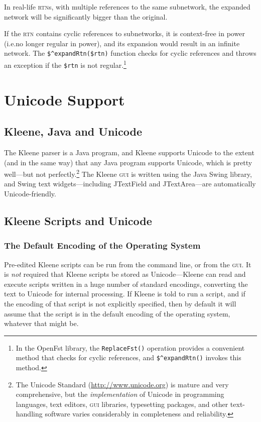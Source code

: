 \documentclass[letterpaper,12pt]{article}
\newcommand{\acro}{\textsc}
\begin{document}
\noindent
In real-life \acro{rtn}s, with multiple references to the same
subnetwork, the expanded network will be significantly bigger than the
original.  

If the \acro{rtn} contains cyclic references to subnetworks, it is
context-free in power (i.e.\@ no longer regular in power), and its
expansion would result in an infinite network.  The
\verb!$^expandRtn($rtn)! function checks for cyclic references and throws
an exception if the \verb!$rtn! is not regular.\footnote{In the OpenFst
library, the \verb!ReplaceFst()! operation provides a convenient method
that checks for cyclic references, and \verb!$^expandRtn()! invokes this
method.}


\section{Unicode Support}

\subsection{Kleene, Java and Unicode}

The Kleene parser is a Java program, and Kleene supports Unicode to the extent (and
in the same way) that any Java program supports Unicode, which is pretty well---but
not perfectly.\footnote{The Unicode Standard (\url{http://www.unicode.org})
is mature and very comprehensive, but
the \emph{implementation} of Unicode in programming languages, 
text editors, \acro{gui} libraries,
typesetting packages, and other text-handling software varies considerably in completeness
and reliability.}  The
Kleene \acro{gui} is written using the Java Swing library, and Swing text
widgets---including JTextField and JTextArea---are automatically Unicode-friendly.  

\subsection{Kleene Scripts and Unicode}

\subsubsection{The Default Encoding of the Operating System}

Pre-edited Kleene scripts can be run from the command line, or from the \acro{gui}.
It is \emph{not} required that Kleene scripts be stored as Unicode---Kleene can
read and execute scripts written in a huge number of standard encodings, converting the text to Unicode for
internal processing.  If Kleene is told to run a script, and if the encoding of that script is not
explicitly specified, then by default it will assume that the script is in the
default encoding of the operating system, whatever that might be.
\end{document}
